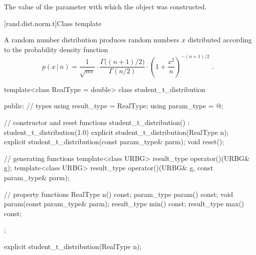 \begin{itemdescr}
\pnum
\returns
The value of the  parameter
 with which the object was constructed.
\end{itemdescr}


[rand.dist.norm.t]{Class template }%
%
%

\pnum
A  random number distribution
produces random numbers $x$
distributed according to
the probability density function%
%
%
\[ p(x\,|\,n) = \frac{1}{\sqrt{n \pi}}
     \cdot \frac{\Gamma\big((n+1)/2\big)}{\Gamma(n/2)}
     \cdot \left(1 + \frac{x^2}{n} \right)^{-(n+1)/2}
     \text{ .} \]

%
%
\begin{codeblock}
template<class RealType = double>
  class student_t_distribution {
  public:
    // types
    using result_type = RealType;
    using param_type  = @\unspec@;

    // constructor and reset functions
    student_t_distribution() : student_t_distribution(1.0) {}
    explicit student_t_distribution(RealType n);
    explicit student_t_distribution(const param_type& parm);
    void reset();

    // generating functions
    template<class URBG>
      result_type operator()(URBG& g);
    template<class URBG>
      result_type operator()(URBG& g, const param_type& parm);

    // property functions
    RealType n() const;
    param_type param() const;
    void param(const param_type& parm);
    result_type min() const;
    result_type max() const;
  };
\end{codeblock}

\begin{indexed}{}
\begin{itemdecl}
explicit student_t_distribution(RealType n);
\end{itemdecl}
\end{indexed}

